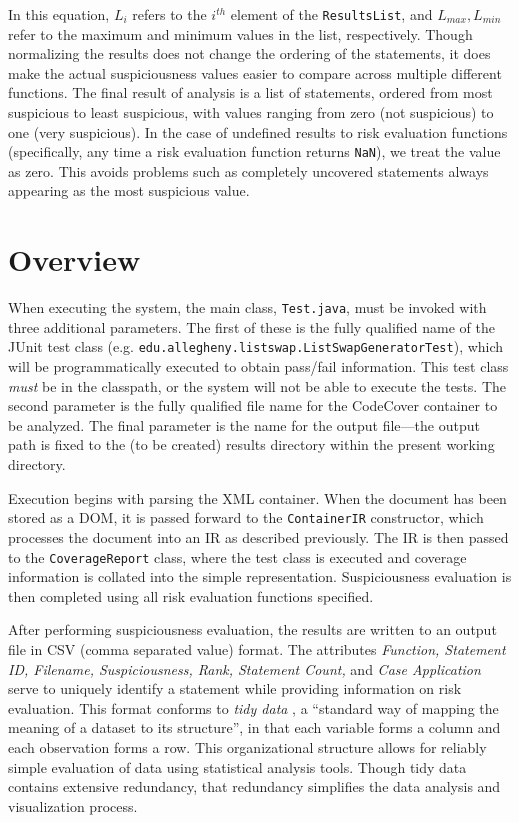 In this equation, $L_i$ refers to the $i^{th}$ element of the \texttt{ResultsList}, and $L_{max}, L_{min}$
refer to the maximum and minimum values in the list, respectively.  Though normalizing the results does
not change the ordering of the statements, it does make the actual suspiciousness values easier to compare
across multiple different functions.  The final result of analysis is a list of statements, ordered from
most suspicious to least suspicious, with values ranging from zero (not suspicious) to one (very 
suspicious).  In the case of undefined results to risk evaluation functions (specifically, any time a
risk evaluation function returns \texttt{NaN}), we treat the value as zero.  This avoids problems such as
completely uncovered statements always appearing as the most suspicious value.

\section{Overview} \label{sec:over}

When executing the system, the main class, \texttt{Test.java}, must be invoked with three additional
parameters.  The first of these is the fully qualified name of the JUnit test class (e.g. \texttt{edu.allegheny.listswap.ListSwapGeneratorTest}), which will be programmatically executed to
obtain pass/fail information.  This test class \emph{must} be in the classpath, or the system will
not be able to execute the tests.  The second parameter is the fully qualified file name for the 
CodeCover container to be analyzed.  The final parameter is the name for the output file---the 
output path is fixed to the (to be created) results directory within the present working directory.

Execution begins with parsing the XML container.  When the document has been stored as a DOM, it is
passed forward to the \texttt{ContainerIR} constructor, which processes the document into an IR as
described previously.  The IR is then passed to the \texttt{CoverageReport} class, where the 
test class is executed and coverage information is collated into the simple representation.
Suspiciousness evaluation is then completed using all risk evaluation functions specified.

After performing suspiciousness evaluation, the results are written to an output file in CSV (comma
separated value) format.  The attributes \textit{Function, Statement ID, Filename, Suspiciousness, Rank,
Statement Count,}
and \textit{Case Application} serve to uniquely identify a statement while providing information on risk evaluation.  
This format conforms to \textit{tidy data}  \cite{tidy}, a ``standard way of mapping the meaning of a 
dataset to its structure'', in that each variable forms a column and each observation forms a row.  
This organizational structure allows for reliably simple evaluation of data using statistical 
analysis tools.  Though tidy data contains extensive redundancy, that redundancy simplifies
the data analysis and visualization process.

